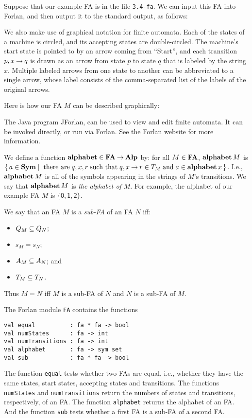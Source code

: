 Suppose that our example FA is in the file \texttt{3.4-fa}.
We can input this FA into Forlan, and then output it to the
standard output, as follows:


We also make use of graphical notation for finite automata.
Each of the states of a machine is circled,
and its accepting states are double-circled.  The machine's start state is
pointed to by an arrow coming from ``Start'', and
each transition $p, x\mathbin{\to} q$ is drawn as an arrow from state $p$
to state $q$ that is labeled by the string $x$.  Multiple labeled
arrows from one state to another can be abbreviated to a single
arrow, whose label consists of the comma-separated list of the
labels of the original arrows.

Here is how our FA $M$ can be described graphically:
\begin{center}

\end{center}

The Java program JForlan, can be used to view and edit finite
automata.  It can be invoked directly, or run via Forlan.  See the
Forlan website for more information.

%
%
We define a function $\mathbf{alphabet}\in\mathbf{FA}\mathbin{\to}\mathbf{Alp}$ by: for all $M\in\mathbf{FA}$,
$\mathbf{alphabet}\,M$ is $\{ \, a\in\mathbf{Sym} \mid \;\allowbreak\mbox{there are}\allowbreak\;q,x,r\;\allowbreak\mbox{such
    that}\allowbreak\; q,x\mathbin{\to} r\in T_M\;\allowbreak\mbox{and}\allowbreak\;a\in\mathbf{alphabet}\,x \, \}$.  I.e.,
$\mathbf{alphabet}\,M$ is all of the symbols appearing in the strings of $M$'s
transitions.  We say that $\mathbf{alphabet}\,M$ is \emph{the alphabet of}
$M$.  For example, the alphabet of our example FA $M$ is
$\{\mathsf{0,1,2}\}$.

%
We say that an FA $M$ is a \emph{sub-FA} of an FA $N$ iff:
\begin{itemize}
\item $Q_M\subseteq Q_N$;
\item $s_M = s_N$;
\item $A_M\subseteq A_N$; and
\item $T_M\subseteq T_N$.
\end{itemize}
Thus $M=N$ iff $M$ is a sub-FA of $N$ and $N$ is a sub-FA of $M$.

The Forlan module \texttt{FA} contains the functions
\begin{verbatim}
val equal          : fa * fa -> bool
val numStates      : fa -> int
val numTransitions : fa -> int
val alphabet       : fa -> sym set
val sub            : fa * fa -> bool
\end{verbatim}
%
%
%
%
%
The function \texttt{equal} tests whether two FAs are equal, i.e.,
whether they have the same states, start states, accepting states
and transitions.
The functions \texttt{numStates} and \texttt{numTransitions} return
the numbers of states and transitions, respectively, of an FA.
The function \texttt{alphabet} returns the alphabet of an FA.  
And the function \texttt{sub} tests whether a first FA is a sub-FA of
a second FA.

